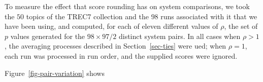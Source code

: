 To measure the effect that score rounding has on system comparisons,
we took the $50$ topics of the TREC7 collection and the $98$ runs
associated with it that we have been using, and computed, for each of
eleven different values of $\rho$, the set of $p$ values generated
for the $98\times97/2$ distinct system pairs.
In all cases when $\rho>1$, the averaging processes described in
Section~\ref{sec-ties} were ued; when $\rho=1$, each run was
processed in run order, and the supplied scores were ignored.

Figure~\ref{fig-pair-variation} shows {}
